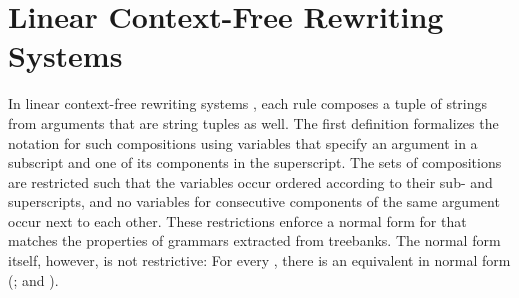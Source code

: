 \documentclass[../../document.tex]{subfiles}
\begin{document}
    \section{Linear Context-Free Rewriting Systems}\label{sec:grammar:lcfrs}
    In linear context-free rewriting systems , each rule composes a tuple of strings from arguments that are string tuples as well.
    The first definition formalizes the notation for such compositions using variables that specify an argument in a subscript and one of its components in the superscript.
    The sets of compositions are restricted such that the variables occur ordered according to their sub- and superscripts, and no variables for consecutive components of the same argument occur next to each other.
    These restrictions enforce a normal form for  that matches the properties of grammars extracted from treebanks.
    The normal form itself, however, is not restrictive: For every , there is an equivalent  in normal form (\citealp[Lemma~2.2]{SekMatFujKas91}; and \citealp[Definition~7.2]{Kal10}).
\end{document}
